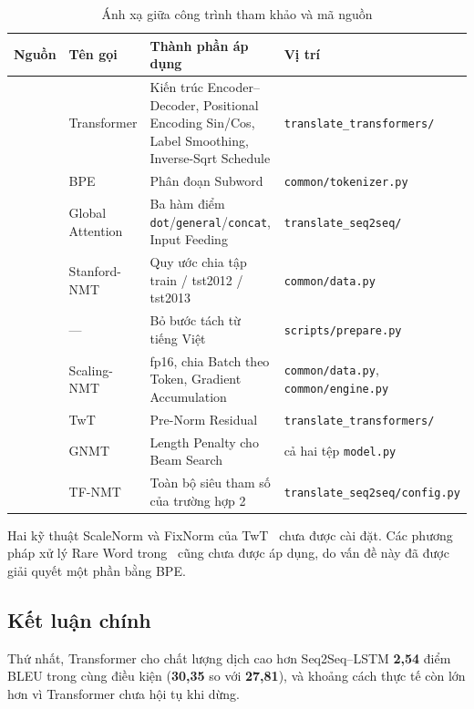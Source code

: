 \documentclass[11pt,a4paper]{article}
\newcommand{\file}[1]{\texttt{\small #1}}
\begin{document}
\begin{table}[H]
\centering
\small
\caption{Ánh xạ giữa công trình tham khảo và mã nguồn}
\label{tab:applied}
\begin{tabularx}{\textwidth}{llXl}
\toprule
\textbf{Nguồn} & \textbf{Tên gọi} & \textbf{Thành phần áp dụng} & \textbf{Vị trí} \\
\midrule
\cite{vaswani2017} & Transformer &
Kiến trúc Encoder--Decoder, Positional Encoding Sin/Cos, Label Smoothing,
Inverse-Sqrt Schedule & \file{translate\_transformers/} \\
\addlinespace
\cite{sennrich2016} & BPE &
Phân đoạn Subword & \file{common/tokenizer.py} \\
\addlinespace
\cite{luong2015emnlp} & Global Attention &
Ba hàm điểm \file{dot}/\file{general}/\file{concat}, Input Feeding
& \file{translate\_seq2seq/} \\
\addlinespace
\cite{luong2015iwslt} & Stanford-NMT &
Quy ước chia tập train / tst2012 / tst2013 & \file{common/data.py} \\
\addlinespace
\cite{phanvu2017} & --- &
Bỏ bước tách từ tiếng Việt & \file{scripts/prepare.py} \\
\addlinespace
\cite{ott2018} & Scaling-NMT &
fp16, chia Batch theo Token, Gradient Accumulation
& \file{common/data.py}, \file{common/engine.py} \\
\addlinespace
\cite{nguyen2019} & TwT &
Pre-Norm Residual & \file{translate\_transformers/} \\
\addlinespace
\cite{wu2016} & GNMT &
Length Penalty cho Beam Search & cả hai tệp \file{model.py} \\
\addlinespace
\cite{tfnmt} & TF-NMT &
Toàn bộ siêu tham số của trường hợp 2 & \file{translate\_seq2seq/config.py} \\
\bottomrule
\end{tabularx}
\end{table}

Hai kỹ thuật ScaleNorm và FixNorm của TwT~\cite{nguyen2019} chưa được cài đặt.
Các phương pháp xử lý Rare Word trong~\cite{nguyen2019rare} cũng chưa được áp
dụng, do vấn đề này đã được giải quyết một phần bằng BPE.

\subsection{Kết luận chính}

Thứ nhất, Transformer cho chất lượng dịch cao hơn Seq2Seq--LSTM \textbf{2,54}
điểm BLEU trong cùng điều kiện (\textbf{30,35} so với \textbf{27,81}), và khoảng
cách thực tế còn lớn hơn vì Transformer chưa hội tụ khi dừng.
\end{document}
